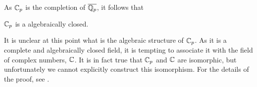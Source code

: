 As $\mathbb{C}_p$ is the completion of $\overline{\mathbb{Q}_p}$, it follows that
\begin{corollary}
    $\mathbb{C}_p$ is a algebraically closed.
\end{corollary}

It is unclear at this point what is the algebraic structure of $\mathbb{C}_p$. 
As it is a complete and algebraically closed field, it is tempting to associate it with the field of complex numbers, $\mathbb{C}$. It is in fact true that $\mathbb{C}_p$ and $\mathbb{C}$ are isomorphic, but unfortunately we cannot explicitly construct this isomorphism. For the details of the proof, see \cite[p. 144]{Robert_2013}.



